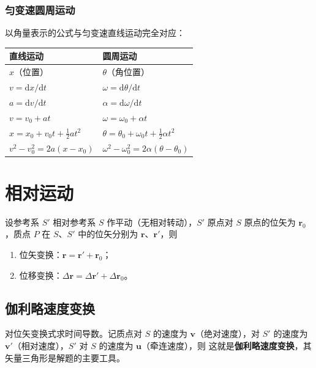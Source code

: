         \subsubsection{匀变速圆周运动}
        以角量表示的公式与匀变速直线运动完全对应：

        \begin{center}
        \begin{tabular}{ll}
        \toprule
        直线运动 & 圆周运动 \\
        \midrule
        $x$（位置） & $\theta$（角位置） \\
        $v=\mathrm{d}x/\mathrm{d}t$ & $\omega=\mathrm{d}\theta/\mathrm{d}t$ \\
        $a=\mathrm{d}v/\mathrm{d}t$ & $\alpha=\mathrm{d}\omega/\mathrm{d}t$ \\
        $v=v_{0}+at$ & $\omega=\omega_{0}+\alpha t$ \\
        $x=x_{0}+v_{0}t+\frac{1}{2}at^{2}$ & $\theta=\theta_{0}+\omega_{0}t+\frac{1}{2}\alpha t^{2}$ \\
        $v^{2}-v_{0}^{2}=2a(x-x_{0})$ & $\omega^{2}-\omega_{0}^{2}=2\alpha(\theta-\theta_{0})$ \\
        \bottomrule
        \end{tabular}
        \end{center}

\section{相对运动}
    设参考系 $S'$ 相对参考系 $S$ 作平动（无相对转动），$S'$ 原点对 $S$ 原点的位矢为 $\boldsymbol{r}_{0}$，质点 $P$ 在 $S$、$S'$ 中的位矢分别为 $\boldsymbol{r}$、$\boldsymbol{r}'$，则
    \begin{enumerate}
        \item 位矢变换：$\boldsymbol{r}=\boldsymbol{r}'+\boldsymbol{r}_{0}$；
        \item 位移变换：$\Delta\boldsymbol{r}=\Delta\boldsymbol{r}'+\Delta\boldsymbol{r}_{0}$。
    \end{enumerate}

    \subsection{伽利略速度变换}
    对位矢变换式求时间导数。记质点对 $S$ 的速度为 $\boldsymbol{v}$（绝对速度），对 $S'$ 的速度为 $\boldsymbol{v}'$（相对速度），$S'$ 对 $S$ 的速度为 $\boldsymbol{u}$（牵连速度），则
    这就是\textbf{伽利略速度变换}，其矢量三角形是解题的主要工具。

